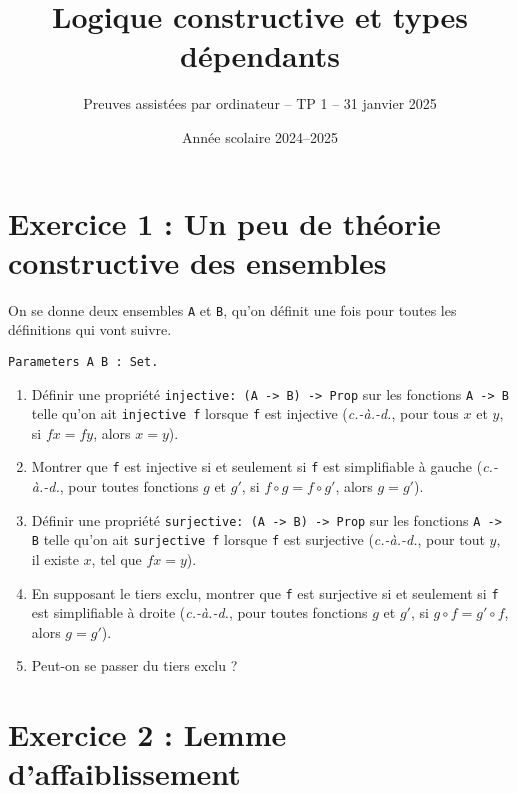 \documentclass{article}
\begin{document}
\title{Logique constructive et types dépendants}
\author{Preuves assistées par ordinateur -- TP 1 -- 31 janvier 2025}
\date{Année scolaire 2024--2025}
\maketitle

\section*{Exercice 1 : Un peu de théorie constructive des ensembles}

On se donne deux ensembles \texttt{A} et \texttt{B},
qu'on définit une fois pour toutes les définitions qui vont suivre.

\begin{verbatim}
Parameters A B : Set.
\end{verbatim}

\begin{enumerate}
\item Définir une propriété \texttt{injective: (A -> B) -> Prop} sur
les fonctions \texttt{A -> B} telle qu'on ait
\texttt{injective f} lorsque \texttt{f} est injective
(\emph{c.-à.-d.}, pour tous \(x\) et \(y\), si \(f x = f y\), alors \(x = y\)).
\item Montrer que \texttt{f} est injective si et seulement si
\texttt{f} est simplifiable à gauche
(\emph{c.-à.-d.}, pour toutes fonctions \(g\) et \(g'\), si \(f \circ g = f \circ g'\),
alors \(g = g'\)).
\item Définir une propriété \texttt{surjective: (A -> B) -> Prop} sur
les fonctions \texttt{A -> B} telle qu'on ait
\texttt{surjective f} lorsque \texttt{f} est surjective
(\emph{c.-à.-d.}, pour tout \(y\), il existe \(x\), tel que \(f x = y\)).
\item En supposant le tiers exclu, montrer que \texttt{f} est surjective si et seulement si
\texttt{f} est simplifiable à droite
(\emph{c.-à.-d.}, pour toutes fonctions \(g\) et \(g'\), si \(g \circ f = g' \circ f\),
alors \(g = g'\)).
\item Peut-on se passer du tiers exclu ?
\end{enumerate}

\section*{Exercice 2 : Lemme d'affaiblissement}
\end{document}
